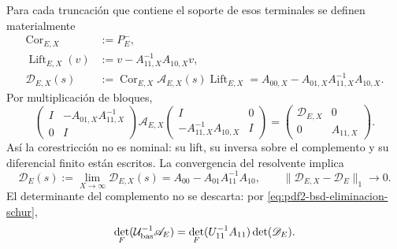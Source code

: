 Para cada truncación que contiene el soporte de esos terminales se definen
materialmente
\begin{equation}\label{eq:pdf2-bsd-cor-lift-truncados}
 \begin{aligned}
  \operatorname{Cor}_{E,X}&:=P_E^-,\\
  \operatorname{Lift}_{E,X}(v)&:=
       v-A_{11,X}^{-1}A_{10,X}v,\\
  \mathscr D_{E,X}(s)&:=
       \operatorname{Cor}_{E,X}\mathscr A_{E,X}(s)
       \operatorname{Lift}_{E,X}
       =A_{00,X}-A_{01,X}A_{11,X}^{-1}A_{10,X}.
 \end{aligned}
\end{equation}
Por multiplicación de bloques,
\begin{equation}\label{eq:pdf2-bsd-eliminacion-schur}
 \begin{pmatrix}I&-A_{01,X}A_{11,X}^{-1}\\0&I\end{pmatrix}
 \mathscr A_{E,X}
 \begin{pmatrix}I&0\\-A_{11,X}^{-1}A_{10,X}&I\end{pmatrix}
 =\begin{pmatrix}\mathscr D_{E,X}&0\\0&A_{11,X}\end{pmatrix}.
\end{equation}
Así la corestricción no es nominal: su lift, su inversa sobre el complemento
y su diferencial finito están escritos. La convergencia del resolvente
implica
\begin{equation}\label{eq:pdf2-bsd-corestriccion-limite}
 \mathscr D_E(s):=\lim_{X\to\infty}\mathscr D_{E,X}(s)
 =A_{00}-A_{01}A_{11}^{-1}A_{10},
 \qquad
 \|\mathscr D_{E,X}-\mathscr D_E\|_1\to0.
\end{equation}
El determinante del complemento no se descarta: por
\eqref{eq:pdf2-bsd-eliminacion-schur},
\begin{equation}\label{eq:pdf2-bsd-determinante-schur-complemento}
 \det_F(\mathcal U_{\rm bas}^{-1}\mathscr A_E)
 =\det_F(U_{11}^{-1}A_{11})\det(\mathscr D_E).
\end{equation}

